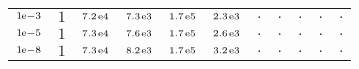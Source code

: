 \begin{tiny}
\begin{tabular}{@{$\;$}c@{$\;$}|@{$\;$}c@{$\;$}@{$\;$}c@{$\;$}@{$\;$}c@{$\;$}@{$\;$}c@{$\;$}@{$\;$}c@{$\;$}|@{$\;$}c@{$\;$}@{$\;$}c@{$\;$}@{$\;$}c@{$\;$}@{$\;$}c@{$\;$}@{$\;$}c@{$\;$}}
$\scriptstyle1\!\mathrm{\hspace{0.10em}e}-3$ & $\scriptstyle1$ & $\scriptstyle7.2\mathrm{\hspace{0.10em}e}4$ & $\scriptstyle7.3\mathrm{\hspace{0.10em}e}3$ & $\scriptstyle1.7\mathrm{\hspace{0.10em}e}5$ & $\scriptstyle2.3\mathrm{\hspace{0.10em}e}3$ & $\scriptstyle.$ & $\scriptstyle.$ & $\scriptstyle.$ & $\scriptstyle.$ & $\scriptstyle.$\\ 
$\scriptstyle1\!\mathrm{\hspace{0.10em}e}-5$ & $\scriptstyle1$ & $\scriptstyle7.3\mathrm{\hspace{0.10em}e}4$ & $\scriptstyle7.6\mathrm{\hspace{0.10em}e}3$ & $\scriptstyle1.7\mathrm{\hspace{0.10em}e}5$ & $\scriptstyle2.6\mathrm{\hspace{0.10em}e}3$ & $\scriptstyle.$ & $\scriptstyle.$ & $\scriptstyle.$ & $\scriptstyle.$ & $\scriptstyle.$\\ 
$\scriptstyle1\!\mathrm{\hspace{0.10em}e}-8$ & $\scriptstyle1$ & $\scriptstyle7.3\mathrm{\hspace{0.10em}e}4$ & $\scriptstyle8.2\mathrm{\hspace{0.10em}e}3$ & $\scriptstyle1.7\mathrm{\hspace{0.10em}e}5$ & $\scriptstyle3.2\mathrm{\hspace{0.10em}e}3$ & $\scriptstyle.$ & $\scriptstyle.$ & $\scriptstyle.$ & $\scriptstyle.$ & $\scriptstyle.$\\ 
\end{tabular} 
\end{tiny} 
